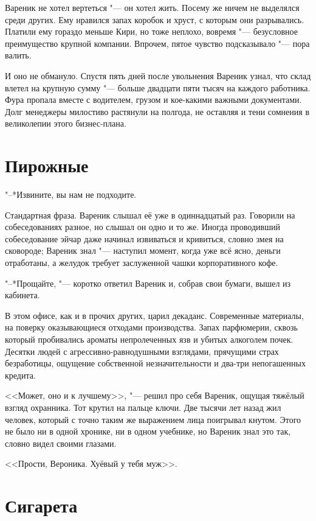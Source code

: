 Вареник не хотел вертеться "--- он хотел жить.
Посему же ничем не выделялся среди других.
Ему нравился запах коробок и хруст, с которым они разрывались.
Платили ему гораздо меньше Кири, но тоже неплохо, вовремя "--- безусловное преимущество крупной компании.
Впрочем, пятое чувство подсказывало "--- пора валить.

И оно не обмануло.
Спустя пять дней после увольнения Вареник узнал, что склад влетел на крупную сумму "--- больше двадцати пяти тысяч на каждого работника.
Фура пропала вместе с водителем, грузом и кое-какими важными документами.
Долг менеджеры милостиво растянули на полгода, не оставляя и тени сомнения в великолепии этого бизнес-плана.

\section{Пирожные}

"--*Извините, вы нам не подходите.

Стандартная фраза.
Вареник слышал её уже в одиннадцатый раз.
Говорили на собеседованиях разное, но слышал он одно и то же.
Иногда проводивший собеседование эйчар даже начинал извиваться и кривиться, словно змея на сковороде;
Вареник знал "--- наступил момент, когда уже всё ясно, деньги отработаны, а желудок требует заслуженной чашки корпоративного кофе.

"--*Прощайте, "--- коротко ответил Вареник и, собрав свои бумаги, вышел из кабинета.

В этом офисе, как и в прочих других, царил декаданс.
Современные материалы, на поверку оказывающиеся отходами производства.
Запах парфюмерии, сквозь который пробивались ароматы непролеченных язв и убитых алкоголем почек.
Десятки людей с агрессивно-равнодушными взглядами, прячущими страх безработицы, ощущение собственной незначительности и два-три непогашенных кредита.

<<Может, оно и к лучшему>>, "--- решил про себя Вареник, ощущая тяжёлый взгляд охранника.
Тот крутил на пальце ключи.
Две тысячи лет назад жил человек, который с точно таким же выражением лица поигрывал кнутом.
Этого не было ни в одной хронике, ни в одном учебнике, но Вареник знал это так, словно видел своими глазами.

<<Прости, Вероника.
Хуёвый у тебя муж>>.

\section{Сигарета}

